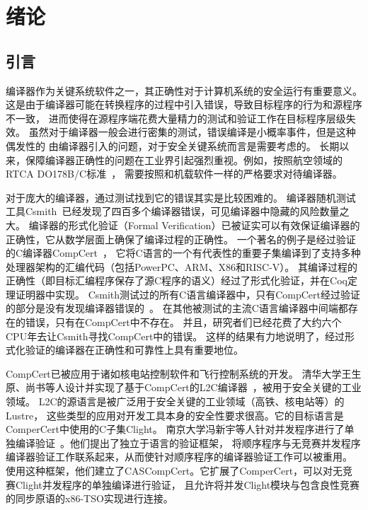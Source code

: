 
\chapter{绪论}


\section{引言}

编译器作为关键系统软件之一，其正确性对于计算机系统的安全运行有重要意义。
这是由于编译器可能在转换程序的过程中引入错误，导致目标程序的行为和源程序不一致，
进而使得在源程序端花费大量精力的测试和验证工作在目标程序层级失效。
虽然对于编译器一般会进行密集的测试，错误编译是小概率事件，但是这种偶发性的
由编译器引入的问题，对于安全关键系统而言是需要考虑的。
长期以来，保障编译器正确性的问题在工业界引起强烈重视。例如，按照航空领域的RTCA DO178B/C标准~\cite{brosgol2010178c}，
需要按照和机载软件一样的严格要求对待编译器。

对于庞大的编译器，通过测试找到它的错误其实是比较困难的。
编译器随机测试工具Csmith~\cite{csmith2011}已经发现了四百多个编译器错误，可见编译器中隐藏的风险数量之大。
编译器的形式化验证（Formal Verification）已被证实可以有效保证编译器的正确性，它从数学层面上确保了编译过程的正确性。
一个著名的例子是经过验证的C编译器CompCert~\cite{leroy2009formally}，
它将C语言的一个有代表性的重要子集编译到了支持多种处理器架构的汇编代码（包括PowerPC、ARM、X86和RISC-V）。
其编译过程的正确性（即目标汇编程序保存了源C程序的语义）经过了形式化验证，并在Coq定理证明器中实现。
Csmith测试过的所有C语言编译器中，只有CompCert经过验证的部分是没有发现编译器错误的~\cite{csmith2011}。
在其他被测试的主流C语言编译器中间端都存在的错误，只有在CompCert中不存在。
并且，研究者们已经花费了大约六个CPU年去让Csmith寻找CompCert中的错误。
这样的结果有力地说明了，经过形式化验证的编译器在正确性和可靠性上具有重要地位。

CompCert已被应用于诸如核电站控制软件和飞行控制系统的开发。
清华大学王生原、尚书等人设计并实现了基于CompCert的L2C编译器~\cite{shang2017key}，被用于安全关键的工业领域。
L2C的源语言是被广泛用于安全关键的工业领域（高铁、核电站等）的Lustre，
这些类型的应用对开发工具本身的安全性要求很高。它的目标语言是ComperCert中使用的C子集Clight。
南京大学冯新宇等人针对并发程序进行了单独编译验证~\cite{jiang2019towards}。他们提出了独立于语言的验证框架，
将顺序程序与无竞赛并发程序编译器验证工作联系起来，从而使针对顺序程序的编译器验证工作可以被重用。
使用这种框架，他们建立了CASCompCert。它扩展了ComperCert，可以对无竞赛Clight并发程序的单独编译进行验证，
且允许将并发Clight模块与包含良性竞赛的同步原语的x86-TSO实现进行连接。

